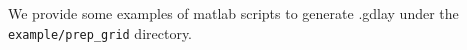 \begin{itemize}
\begin{itemize}
\end{itemize}

We provide some examples of matlab scripts to generate .gdlay under the \texttt{example/prep\_grid} directory.

%
%
%
%

\end{itemize}
